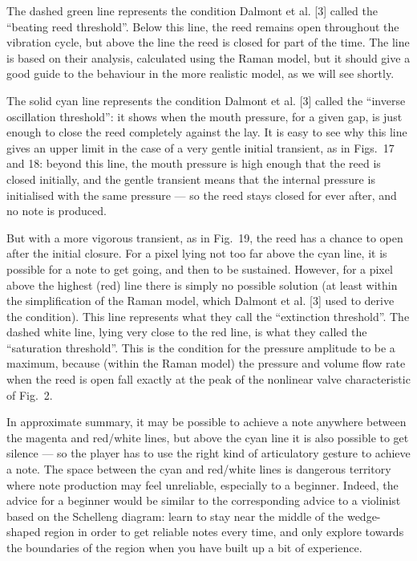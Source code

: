   The dashed green line represents the condition Dalmont et al. [3] called the 
  “beating reed threshold”. Below this line, the reed remains open throughout 
  the vibration cycle, but above the line the reed is closed for part of the 
  time. The line is based on their analysis, calculated using the Raman model, 
  but it should give a good guide to the behaviour in the more realistic model, 
  as we will see shortly. 

  The solid cyan line represents the condition Dalmont et al. [3] called the 
  “inverse oscillation threshold”: it shows when the mouth pressure, for a 
  given gap, is just enough to close the reed completely against the lay. It is 
  easy to see why this line gives an upper limit in the case of a very gentle 
  initial transient, as in Figs.\ 17 and 18: beyond this line, the mouth 
  pressure is high enough that the reed is closed initially, and the gentle 
  transient means that the internal pressure is initialised with the same 
  pressure — so the reed stays closed for ever after, and no note is produced. 

  But with a more vigorous transient, as in Fig.\ 19, the reed has a chance to 
  open after the initial closure. For a pixel lying not too far above the cyan 
  line, it is possible for a note to get going, and then to be sustained. 
  However, for a pixel above the highest (red) line there is simply no possible 
  solution (at least within the simplification of the Raman model, which 
  Dalmont et al. [3] used to derive the condition). This line represents what 
  they call the “extinction threshold”. The dashed white line, lying very close 
  to the red line, is what they called the ``saturation threshold''. This is 
  the condition for the pressure amplitude to be a maximum, because (within the 
  Raman model) the pressure and volume flow rate when the reed is open fall 
  exactly at the peak of the nonlinear valve characteristic of Fig.\ 2. 

  In approximate summary, it may be possible to achieve a note anywhere between 
  the magenta and red/white lines, but above the cyan line it is also possible 
  to get silence — so the player has to use the right kind of articulatory 
  gesture to achieve a note. The space between the cyan and red/white lines is 
  dangerous territory where note production may feel unreliable, especially to 
  a beginner. Indeed, the advice for a beginner would be similar to the 
  corresponding advice to a violinist based on the Schelleng diagram: learn to 
  stay near the middle of the wedge-shaped region in order to get reliable 
  notes every time, and only explore towards the boundaries of the region when 
  you have built up a bit of experience. 

